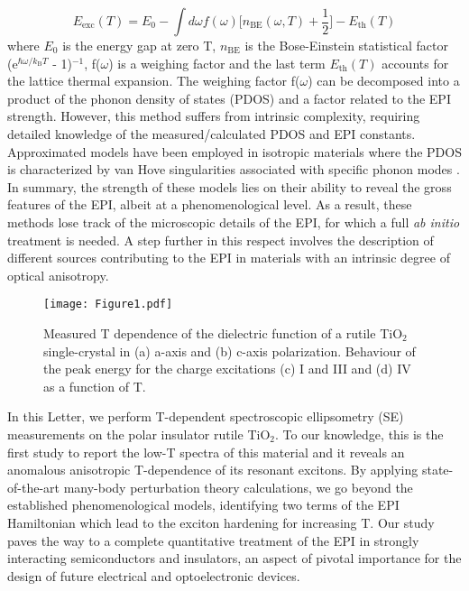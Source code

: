 \documentclass[aps,prl,twocolumn,amsfonts,nobibnotes,superscriptaddress,showpacs]{revtex4-1}
\begin{document}
\begin{equation}
E\mathrm{_{exc}}(T) = E\mathrm{_{0}} - \int d\omega f(\omega) \Big[ n\mathrm{_{BE}}(\omega,T) +\frac{1}{2} \Big] - E\mathrm{_{th}}(T)
\end{equation}
where $E\mathrm{_0}$ is the energy gap at zero T, $n\mathrm{_{BE}}$ is the Bose-Einstein statistical factor (e$^{\hbar\omega/k\mathrm{_B}T}$ - 1)$^{-1}$, f($\omega$) is a weighing factor and the last term $E\mathrm{_{th}}(T)$ accounts for the lattice thermal expansion. The weighing factor f($\omega$) can be decomposed into a product of the phonon density of states (PDOS) and a factor related to the EPI strength. However, this method suffers from intrinsic complexity, requiring detailed knowledge of the measured/calculated PDOS and EPI constants. Approximated models have been employed in isotropic materials where the PDOS is characterized by van Hove singularities associated with specific phonon modes \cite{cardona2014temperature}. In summary, the strength of these models lies on their ability to reveal the gross features of the EPI, albeit at a phenomenological level. As a result, these methods lose track of the microscopic details of the EPI, for which a full \textit{ab initio} treatment is needed. A step further in this respect involves the description of different sources contributing to the EPI in materials with an intrinsic degree of optical anisotropy.

\begin{figure*}[t]
	\begin{center}
		\texttt{[image: Figure1.pdf]}
		\caption{Measured T dependence of the dielectric function of a rutile TiO$_2$ single-crystal in (a) a-axis and (b) c-axis polarization. Behaviour of the peak energy for the charge excitations (c) I and III and (d) IV as a function of T.}
		\label{fig:Fig1}
	\end{center}
\end{figure*}

In this Letter, we perform T-dependent spectroscopic ellipsometry (SE) measurements on the polar insulator rutile TiO$_2$. To our knowledge, this is the first study to report the low-T spectra of this material and it reveals an anomalous anisotropic T-dependence of its resonant excitons. By applying state-of-the-art many-body perturbation theory calculations, we go beyond the established phenomenological models, identifying two terms of the EPI Hamiltonian which lead to the exciton hardening for increasing T. Our study paves the way to a complete quantitative treatment of the EPI in strongly interacting semiconductors and insulators, an aspect of pivotal importance for the design of future electrical and optoelectronic devices.
\end{document}
